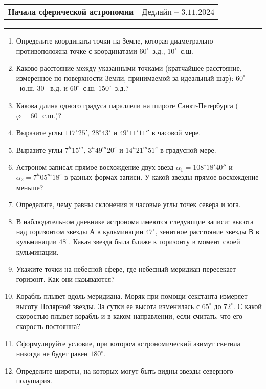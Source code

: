 \documentclass[12pt]{article}
\begin{document}
 \begin{tabularx}{\textwidth}{Xr}
  {\Large \textbf{Начала сферической астрономии}} & Дедлайн -- $3.11.2024$ \\
 \end{tabularx}
 \noindent\rule{\textwidth}{0.4pt}
 \begin{enumerate}
        \item Определите координаты точки на Земле, которая диаметрально противоположна точке с координатами $60^{\circ}$~з.д., $10^{\circ}$~с.ш.
        \item Каково расстояние между указанными точками (кратчайшее расстояние, измеренное по поверхности Земли, принимаемой за идеальный шар): $60^{\circ}$~ю.ш. $30^{\circ}$~в.д. и $60^{\circ}$~с.ш. $150^{\circ}$~з.д.? 
        \item Какова длина одного градуса параллели на широте Санкт-Петербурга ($\varphi=60^{\circ}$ с.ш.)?
        \item Выразите углы $117^{\circ}25'$, $28^{\circ}43'$ и $49^{\circ}11'11''$  в часовой мере.
        \item Выразите углы $7^h 15^m$, $3^h 49^m 20^s$ и $14^h 21^m 51^s$  в градусной мере. 
        \item Астроном записал прямое восхождение двух звезд $\alpha_{1}=108^{\circ}18'40''$ и $\alpha_{2}=7^h 05^m 18^s$ в разных формах записи. У какой звезды прямое восхождение меньше?
        \item Определите, чему равны склонения и часовые углы точек севера и юга.
        \item В наблюдательном дневнике астронома имеются следующие записи: высота над горизонтом звезды А в кульминации $47^{\circ}$, зенитное расстояние звезды В в кульминации $48^{\circ}$. Какая звезда была ближе к горизонту в момент своей кульминации. 
        \item Укажите точки на небесной сфере, где небесный меридиан пересекает горизонт. Как они называются?
        \item Корабль плывет вдоль меридиана. Моряк при помощи секстанта измеряет высоту Полярной звезды. За сутки ее высота изменилась с $65^{\circ}$ до $72^{\circ}$. С какой скоростью плывет корабль и в каком направлении, если считать, что его скорость постоянна? 
        \item Cформулируйте условие, при котором астрономический азимут светила никогда не будет равен $180^{\circ}$.
        \item Определите широты, на которых могут быть видны звезды северного полушария.
 \end{enumerate}
\end{document}
